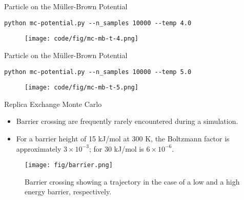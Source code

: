 \documentclass[10pt]{beamer}
\begin{document}
\begin{frame}[fragile]{Particle on the M\"uller-Brown Potential}
\begin{lstlisting}
python mc-potential.py --n_samples 10000 --temp 4.0
\end{lstlisting}
\vspace*{-0.3cm}
\begin{figure}
  \texttt{[image: code/fig/mc-mb-t-4.png]}
\end{figure}
\end{frame}

\begin{frame}[fragile]{Particle on the M\"uller-Brown Potential}
\begin{lstlisting}
python mc-potential.py --n_samples 10000 --temp 5.0
\end{lstlisting}
\vspace*{-0.3cm}
\begin{figure}
  \texttt{[image: code/fig/mc-mb-t-5.png]}
\end{figure}
\end{frame}

\begin{frame}{Replica Exchange Monte Carlo}
\begin{itemize}
\setlength\itemsep{1em}
  \item Barrier crossing are frequently rarely encountered during a simulation.

  \item For a barrier height of 15 kJ/mol at 300 K, the Boltzmann factor is approximately $3\times 10^{-3}$; for 30 kJ/mol is $6\times 10^{-6}$.
\end{itemize}
\begin{figure}
  \texttt{[image: fig/barrier.png]}
  \caption{Barrier crossing showing a trajectory in the case of a low and a high energy barrier, respectively.}
\end{figure}
\end{frame}
\end{document}
